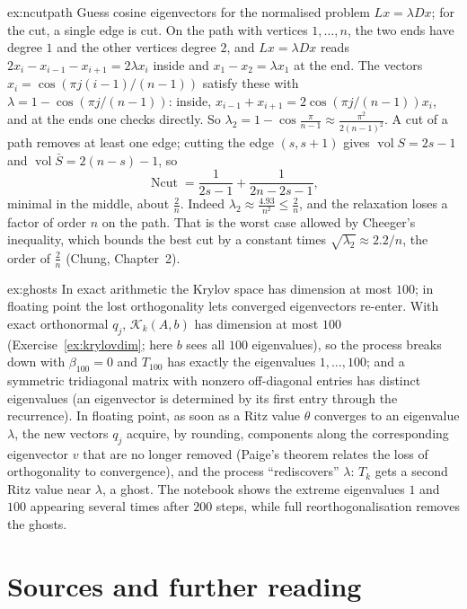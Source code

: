 \begin{solution}{ex:ncutpath}
\idea Guess cosine eigenvectors for the normalised problem $Lx=\lambda Dx$; for the cut, a single edge is cut.
\writeup On the path with vertices $1,\dots,n$, the two ends have degree $1$ and the other vertices degree $2$, and $Lx=\lambda Dx$ reads $2x_i-x_{i-1}-x_{i+1}=2\lambda x_i$ inside and $x_1-x_2=\lambda x_1$ at the end. The vectors $x_i=\cos(\pi j(i-1)/(n-1))$ satisfy
these with $\lambda=1-\cos(\pi j/(n-1))$: inside, $x_{i-1}+x_{i+1}=2\cos(\pi j/(n-1))x_i$, and at the ends one checks directly. So $\lambda_2=1-\cos\frac\pi{n-1}\approx\frac{\pi^2}{2(n-1)^2}$. A cut of a path removes at least one
edge; cutting the edge $(s,s+1)$ gives $\operatorname{vol}S=2s-1$ and $\operatorname{vol}\bar S=2(n-s)-1$, so
\[
\operatorname{Ncut}=\frac1{2s-1}+\frac1{2n-2s-1},
\]
minimal in the middle, about $\frac2n$. Indeed
$\lambda_2\approx\frac{4.93}{n^2}\le\frac2n$, and the relaxation loses a factor of order $n$ on the path. That is the worst case allowed by Cheeger's inequality, which bounds the best cut by a
constant times $\sqrt{\lambda_2}\approx2.2/n$, the order of $\frac2n$ (Chung, Chapter~2).
\end{solution}

\begin{solution}{ex:ghosts}
\idea In exact arithmetic the Krylov space has dimension at most $100$; in floating point the lost orthogonality lets converged eigenvectors re-enter.
\writeup With exact orthonormal $q_j$, $\mathcal K_k(A,b)$ has dimension at most $100$ (Exercise~\ref{ex:krylovdim}; here $b$ sees all $100$ eigenvalues), so the process breaks down with $\beta_{100}=0$ and $T_{100}$
has exactly the eigenvalues $1,\dots,100$; and a symmetric tridiagonal matrix with nonzero off-diagonal entries has distinct eigenvalues (an eigenvector is determined by its first entry through the
recurrence). In floating point, as soon as a Ritz value $\theta$ converges to an eigenvalue $\lambda$, the new vectors $q_j$ acquire, by rounding, components along the corresponding eigenvector $v$ that
are no longer removed (Paige's theorem relates the loss of orthogonality to convergence), and the process ``rediscovers'' $\lambda$: $T_k$ gets a second Ritz value near $\lambda$, a ghost. The notebook
shows the extreme eigenvalues $1$ and $100$ appearing several times after $200$ steps, while full reorthogonalisation removes the ghosts.
\end{solution}

\section*{Sources and further reading}

